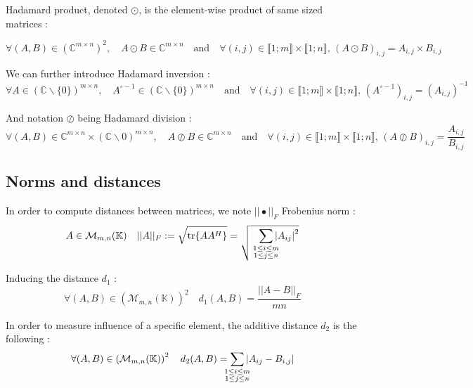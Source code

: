 \documentclass[titlepage]{article}
\newcommand{\hinv}[1]{#1^{\circ-1}} %
\newcommand{\fnorm}[1]{|\vert#1|\vert_{F}} %
\begin{document}
	Hadamard product, denoted $\odot$, is the element-wise product of same sized matrices :
	
	$$
	\forall (A,B)\in\left(\mathbb{C}^{m\times n}\right)^2, \quad A\odot B\in\mathbb{C}^{m\times n} \quad\text{and}\quad \forall (i,j)\in\llbracket1;m\rrbracket\times\llbracket1;n\rrbracket,\, (A\odot B)_{i,j} = A_{i,j}\times B_{i,j}
	$$
	
	We can further introduce Hadamard inversion :
	$$
	\forall A \in \left(\mathbb{C}\backslash\{0\}\right)^{m\times n},\quad \hinv{A}\in\left(\mathbb{C}\backslash\{0\}\right)^{m\times n} \quad\text{and}\quad \forall (i,j)\in\llbracket1;m\rrbracket\times\llbracket1;n\rrbracket,\, \left(\hinv{A}\right)_{i,j} = \left(A_{i,j}\right)^{-1}
	$$ 
	
	And notation $\oslash$ being Hadamard division :
	$$
	\forall (A,B)\in\mathbb{C}^{m\times n}\times\left(\mathbb{C}\backslash0\right)^{m\times n}, \quad A\oslash B\in\mathbb{C}^{m\times n} \quad\text{and}\quad \forall (i,j)\in\llbracket1;m\rrbracket\times\llbracket1;n\rrbracket,\, (A\oslash B)_{i,j} = \frac{A_{i,j}}{B_{i,j}}
	$$
	
	\subsection{Norms and distances}
	
	In order to compute distances between matrices, we note $\fnorm{\bullet}$ Frobenius norm :
	$$
	A\in\mathcal{M}_{m,n}(\mathbb{K}) \quad \fnorm{A} := \sqrt{\tr{AA^H}} = \sqrt{
		\;\;\;\sum_{
			\mathclap{
				\substack{
					1\le i\le m \\1\le j\le n
				}
			}
		}\abs{A_{ij}}^2}
	$$
	
	Inducing the distance $d_1$ :
	$$
	\forall(A,B)\in\left(\mathcal{M}_{m,n}(\mathbb{K})\right)^2\quad d_1(A,B) = \frac{\fnorm{A-B}}{mn}
	$$
	
	In order to measure influence of a specific element, the additive distance $d_2$ is the following :
	$$
	\forall(A,B)\in\left(\mathcal{M}_{m,n}(\mathbb{K})\right)^2\quad d_2(A,B) = \sum_{
		\mathclap{
			\substack{
				1\le i\le m \\1\le j\le n
			}
		}
	}\abs{A_{ij} - B_{i,j}}
	$$
	
\end{document}

